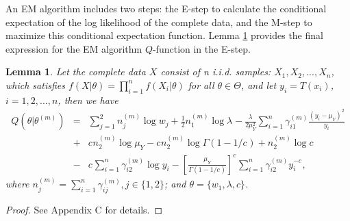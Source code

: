\documentclass[12pt, draftclsnofoot, onecolumn]{IEEEtran}
\newtheorem{MomentsLemma}{Lemma}
\theoremstyle{plain}
\begin{document}
An EM algorithm includes two steps: the E-step to calculate the conditional expectation of the log likelihood of the complete data, and the M-step to maximize this conditional expectation function. Lemma \ref{Qfunction} provides the final expression for the EM algorithm $Q$-function in the E-step. %
\vspace{-.3in}
\begin{MomentsLemma}\label{Qfunction}
 Let the complete data $X$ consist of n i.i.d. samples: $X_1,X_2,...,X_n$, which satisfies $f(X|\theta)=\prod_{i=1}^n f(X_i|\theta)$ for all $\theta \in \Theta$, and let $y_i=T(x_i)$, $i=1,2,...,n$, %
 then we have %
 \begin{eqnarray}
 Q({{{\theta}}}|{{{\theta}}}^{(m)})&=&\sum_{j=1}^2 n_j^{(m)} \log w_j+ \frac{1}{2} n_1^{(m)} \log {{\lambda_{}}} - \frac{{{\lambda_{}}}}{2 \mu_Y^2} \sum_{i=1}^n \gamma_{i1}^{(m)} \frac{(y_i-\mu_Y)^2}{y_i} \nonumber\\
 &+&{{c_{}}} n_2^{(m)} \log \mu_Y -{{c_{}}} n_2^{(m)} \log \Gamma(1-{1}/{{{c_{}}}}) + n_2^{(m)} \log {{c_{}}} \nonumber\\
 &-& {{c_{}}} \sum_{i=1}^n \gamma_{i2}^{(m)} \log y_i - \left[ \frac{\mu_Y}{\Gamma(1-1/{{c_{}}})}\right]^{{{c_{}}}} \sum_{i=1}^n \gamma_{i2}^{(m)} y_i^{-{{c_{}}}}, \label{The1eq0}
 \end{eqnarray}
 where $n_j^{(m)}=\sum_{i=1}^n \gamma_{ij}^{(m)}, j \in \{1,2\}$; and ${{{\theta}}}=\{w_1, \lambda, c\}$. %
 \end{MomentsLemma}\vspace{-.1in}
 \begin{proof}
 See Appendix C for details.
 \end{proof}
\end{document}

